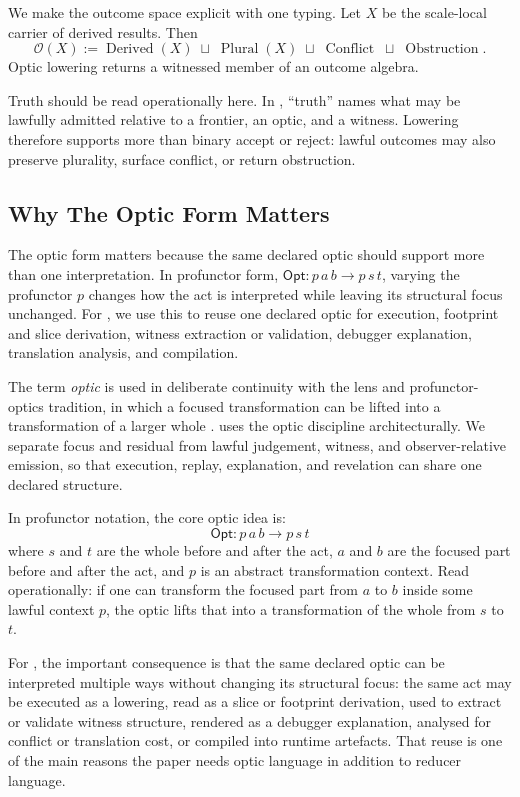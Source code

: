 \documentclass{aion}
\begin{document}
We make the outcome space explicit with one typing. Let \(X\) be the
scale-local carrier of derived results. Then
\[
	\mathcal{O}(X)
	:=
	\operatorname{Derived}(X)
	\;\sqcup\;
	\operatorname{Plural}(X)
	\;\sqcup\;
	\operatorname{Conflict}
	\;\sqcup\;
	\operatorname{Obstruction}.
\]
Optic lowering returns a witnessed member of an outcome algebra.

Truth should be read operationally here. In \WARP{}, ``truth'' names what may be
lawfully admitted relative to a frontier, an optic, and a witness. Lowering
therefore supports more than binary accept or reject: lawful outcomes may also
preserve plurality, surface conflict, or return obstruction.

\subsection{Why The Optic Form Matters}
\label{subsec:optic-form}

The optic form matters because the same declared optic should support more than
one interpretation. In profunctor form,
\(\mathsf{Opt} : p\,a\,b \to p\,s\,t\),
varying the profunctor \(p\) changes how the act is interpreted while leaving
its structural focus unchanged. For \WARP{}, we use this to reuse one declared
optic for execution, footprint and slice derivation, witness extraction or
validation, debugger explanation, translation analysis, and compilation.

The term \emph{optic} is used in deliberate continuity with the lens and
profunctor-optics tradition, in which a focused transformation can be lifted
into a transformation of a larger whole \cite{Foster2007,Pickering2017,Boisseau2018}. \WARP{}
uses the optic discipline architecturally. We separate focus and residual from
lawful judgement, witness, and observer-relative emission, so that execution,
replay, explanation, and revelation can share one declared structure.

In profunctor notation, the core optic idea is:
\[
	\mathsf{Opt} : p\,a\,b \to p\,s\,t
\]
where \(s\) and \(t\) are the whole before and after the act, \(a\) and \(b\)
are the focused part before and after the act, and \(p\) is an abstract
transformation context. Read operationally: if one can transform the focused
part from \(a\) to \(b\) inside some lawful context \(p\), the optic lifts that
into a transformation of the whole from \(s\) to \(t\).

For \WARP{}, the important consequence is that the same declared optic can be
interpreted multiple ways without changing its structural focus: the same act
may be executed as a lowering, read as a slice or footprint derivation, used to
extract or validate witness structure, rendered as a debugger explanation,
analysed for conflict or translation cost, or compiled into runtime artefacts.
That reuse is one of the main reasons the paper needs optic language in
addition to reducer language.
\end{document}
